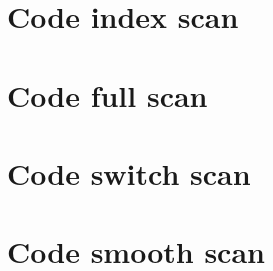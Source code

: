 \documentclass[a4paper,11pt,twoside]{article}
\begin{document}
\begin{appendices}
\section{Code index scan}
\label{appendixa}

\section{Code full scan}
\label{appendixb}

\section{Code switch scan}
\label{appendixc}

\section{Code smooth scan}
\label{appendixd}

\end{appendices}
\end{document}
